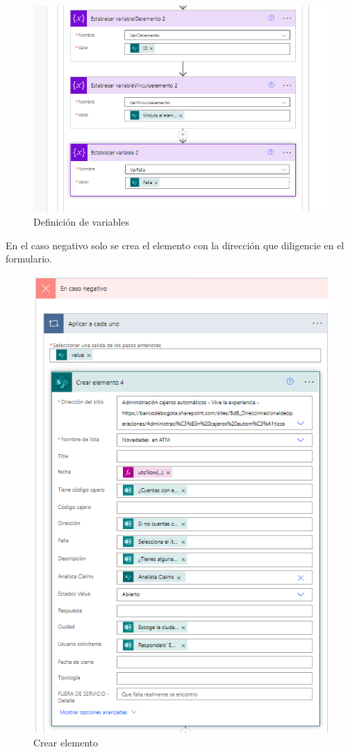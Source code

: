\begin{figure}[H]
	\centering
	\includegraphics[scale=0.5]{Capitulo3/imagenes/flujo12.png}
	\caption{Definición de variables}
	\label{fig:defvar}
\end{figure}

En el caso negativo solo se crea el elemento con la dirección que diligencie en el formulario.

\begin{figure}[H]
	\centering
	\includegraphics[scale=0.5]{Capitulo3/imagenes/flujo13.png}
	\caption{Crear elemento}
	\label{cele}
\end{figure}

